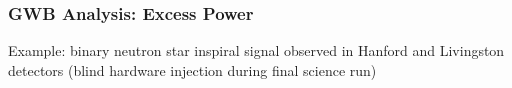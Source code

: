 \documentclass{beamer}
\begin{document}
\begin{frame}
    \frametitle{GWB Analysis: Excess Power}
    Example: binary neutron star inspiral signal observed in Hanford and
    Livingston detectors (blind hardware injection during final science run)
    
        \begin{figure}
            \centering
        \end{figure}
\end{frame}
\end{document}
